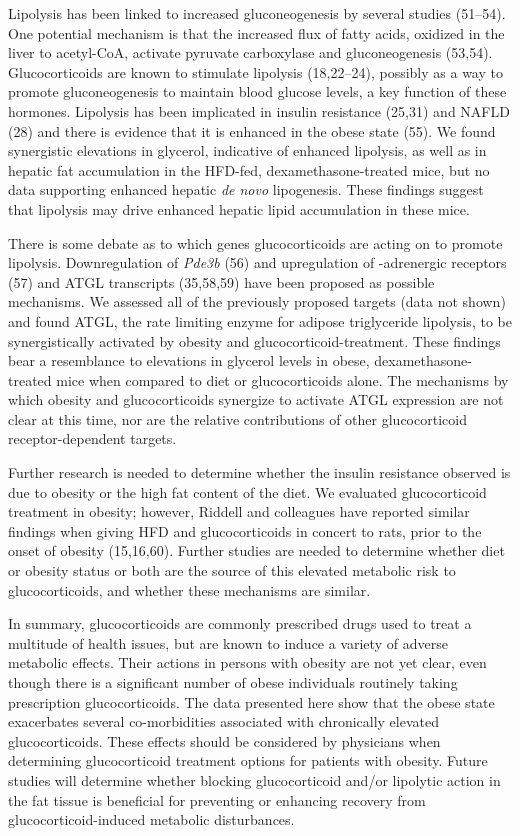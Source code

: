 \documentclass[11pt]{article} %
\begin{document}
Lipolysis has been linked to increased gluconeogenesis by several
studies (51--54). One potential mechanism is that the increased flux of
fatty acids, oxidized in the liver to acetyl-CoA, activate pyruvate
carboxylase and gluconeogenesis (53,54). Glucocorticoids are known to
stimulate lipolysis (18,22--24), possibly as a way to promote
gluconeogenesis to maintain blood glucose levels, a key function of
these hormones. Lipolysis has been implicated in insulin resistance
(25,31) and NAFLD (28) and there is evidence that it is enhanced in the
obese state (55). We found synergistic elevations in glycerol,
indicative of enhanced lipolysis, as well as in hepatic fat accumulation
in the HFD-fed, dexamethasone-treated mice, but no data supporting
enhanced hepatic \emph{de novo} lipogenesis. These findings suggest that
lipolysis may drive enhanced hepatic lipid accumulation in these mice.

There is some debate as to which genes glucocorticoids are acting on to
promote lipolysis. Downregulation of \emph{Pde3b} (56) and upregulation
of -adrenergic receptors (57) and ATGL transcripts (35,58,59) have been
proposed as possible mechanisms. We assessed all of the previously
proposed targets (data not shown) and found ATGL, the rate limiting
enzyme for adipose triglyceride lipolysis, to be synergistically
activated by obesity and glucocorticoid-treatment. These findings bear a
resemblance to elevations in glycerol levels in obese,
dexamethasone-treated mice when compared to diet or glucocorticoids
alone. The mechanisms by which obesity and glucocorticoids synergize to
activate ATGL expression are not clear at this time, nor are the
relative contributions of other glucocorticoid receptor-dependent
targets.

Further research is needed to determine whether the insulin resistance
observed is due to obesity or the high fat content of the diet. We
evaluated glucocorticoid treatment in obesity; however, Riddell and
colleagues have reported similar findings when giving HFD and
glucocorticoids in concert to rats, prior to the onset of obesity
(15,16,60). Further studies are needed to determine whether diet or
obesity status or both are the source of this elevated metabolic risk to
glucocorticoids, and whether these mechanisms are similar.

In summary, glucocorticoids are commonly prescribed drugs used to treat
a multitude of health issues, but are known to induce a variety of
adverse metabolic effects. Their actions in persons with obesity are not
yet clear, even though there is a significant number of obese
individuals routinely taking prescription glucocorticoids. The data
presented here show that the obese state exacerbates several
co-morbidities associated with chronically elevated glucocorticoids.
These effects should be considered by physicians when determining
glucocorticoid treatment options for patients with obesity. Future
studies will determine whether blocking glucocorticoid and/or lipolytic
action in the fat tissue is beneficial for preventing or enhancing
recovery from glucocorticoid-induced metabolic disturbances.
\end{document}
